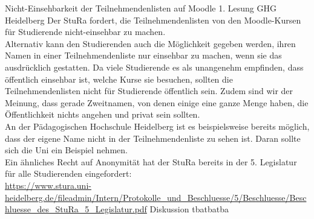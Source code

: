 \antrag
    {
    Nicht-Einsehbarkeit der Teilnehmendenlisten auf Moodle
    }{
        1. Lesung
    }{
        GHG Heidelberg
    }{
        Der StuRa fordert, die Teilnehmendenlisten von den Moodle-Kursen für Studierende nicht-einsehbar zu
        machen.\\
        Alternativ kann den Studierenden auch die Möglichkeit gegeben werden, ihren Namen in einer
        Teilnehmendenliste nur einsehbar zu machen, wenn sie das ausdrücklich gestatten.
    }{
        Da viele Studierende es als unangenehm empfinden, dass öffentlich einsehbar ist, welche Kurse sie
        besuchen, sollten die Teilnehmendenlisten nicht für Studierende öffentlich sein. Zudem sind wir der
        Meinung, dass gerade Zweitnamen, von denen einige eine ganze Menge haben, die Öffentlichkeit nichts
        angehen und privat sein sollten.\\
        An der Pädagogischen Hochschule Heidelberg ist es beispielsweise bereits möglich, dass der eigene
        Name nicht in der Teilnehmendenliste zu sehen ist. Daran sollte sich die Uni ein Beispiel nehmen.\\
        Ein ähnliches Recht auf Anonymität hat der StuRa bereits in der 5. Legislatur für alle Studierenden
        eingefordert:\\
        \url{https://www.stura.uni-heidelberg.de/fileadmin/Intern/Protokolle_und_Beschluesse/5/Beschluesse/Beschluesse_des_StuRa_5_Legislatur.pdf}
    }{
        Diskussion
    }{tba}{tba}{tba}


